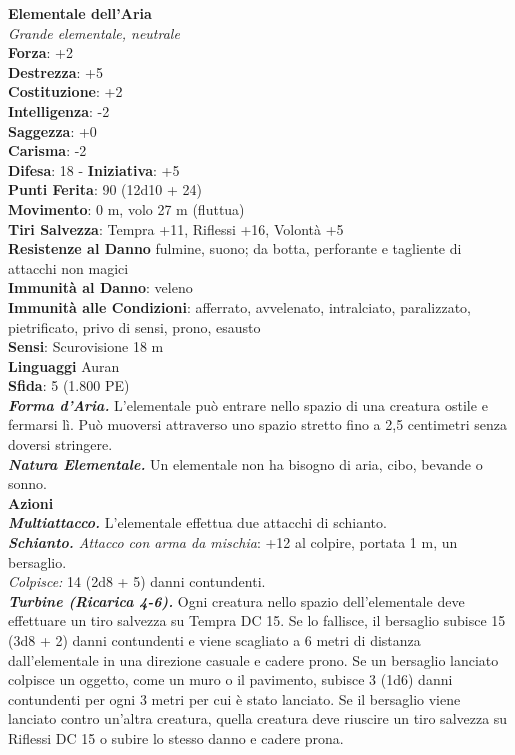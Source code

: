 \begin{multicols}{2}
\medskip\textbf{Elementale dell'Aria}\\
\emph{Grande elementale, neutrale}\\
\textbf{Forza}: +2\\
\textbf{Destrezza}: +5\\
\textbf{Costituzione}: +2\\
\textbf{Intelligenza}: -2\\
\textbf{Saggezza}: +0\\
\textbf{Carisma}: -2\\
\textbf{Difesa}: 18 - \textbf{Iniziativa}: +5\\
\textbf{Punti Ferita}: 90 (12d10 + 24)\\
\textbf{Movimento}: 0 m, volo 27 m (fluttua)\\
\textbf{Tiri Salvezza}: Tempra +11, Riflessi +16, Volontà +5\\
\textbf{Resistenze al Danno} fulmine, suono; da botta, perforante e tagliente di attacchi non magici\\
\textbf{Immunità al Danno}: veleno\\
\textbf{Immunità alle Condizioni}: afferrato, avvelenato, intralciato, paralizzato, pietrificato, privo di sensi, prono, esausto\\
\textbf{Sensi}: Scurovisione 18 m\\
\textbf{Linguaggi} Auran\\
\textbf{Sfida}: 5 (1.800 PE)\smallskip\\
\emph{\textbf{Forma d'Aria.}} L'elementale può entrare nello spazio di una creatura ostile e fermarsi lì. Può muoversi attraverso uno spazio stretto fino a 2,5 centimetri senza doversi stringere.\\
\emph{\textbf{Natura Elementale.}} Un elementale non ha bisogno di aria, cibo, bevande o sonno.\\
\smallskip\textbf{Azioni}\\
\emph{\textbf{Multiattacco.}} L'elementale effettua due attacchi di schianto.\\
\emph{\textbf{Schianto.} Attacco con arma da mischia}: +12 al colpire, portata 1 m, un bersaglio.\\
\emph{Colpisce:} 14 (2d8 + 5) danni contundenti.\\
\emph{\textbf{Turbine (Ricarica 4-6).}} Ogni creatura nello spazio dell'elementale deve effettuare un tiro salvezza su Tempra DC  15. Se lo fallisce, il bersaglio subisce 15 (3d8 + 2) danni contundenti e viene scagliato a 6 metri di distanza dall'elementale in una direzione casuale e cadere prono. Se un bersaglio lanciato colpisce un oggetto, come un muro o il pavimento, subisce 3 (1d6) danni contundenti per ogni 3 metri per cui è stato lanciato. Se il bersaglio viene lanciato contro un'altra creatura, quella creatura deve riuscire un tiro salvezza su Riflessi DC  15 o subire lo stesso danno e cadere prona.\\

\end{multicols}
